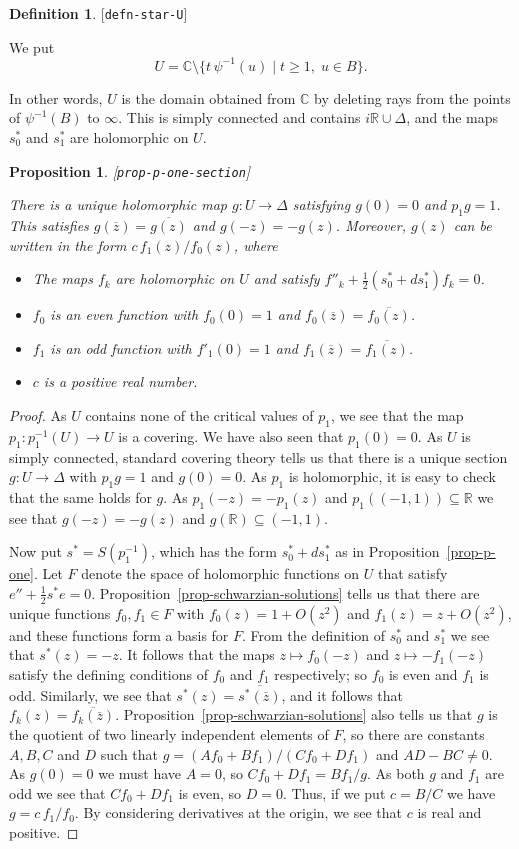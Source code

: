 \documentclass[reqno]{amsart}
\newcommand{\lbl}[1]{\label{#1}\textup{[\texttt{#1}]}\par}
\newcommand{\lbl}{\label}
\newcommand{\Dl}        {\Delta}
\newcommand{\R}         {{\mathbb{R}}}
\newcommand{\C}         {{\mathbb{C}}}
\newcommand{\ov}[1]     {\overline{#1}}
\newcommand{\st}        {\;|\;}
\newcommand{\sm}        {\setminus}
\newcommand{\sse}       {\subseteq}
\newcommand{\half}      {\tfrac{1}{2}}
\renewcommand{\:}{\colon}
\newtheorem{proposition}[theorem]{Proposition}
\theoremstyle{definition}
\newtheorem{definition}[theorem]{Definition}
\begin{document}
\begin{definition}\lbl{defn-star-U}
 We put
 \[ U = \C \sm\{t\,\psi^{-1}(u)\st t\geq 1,\;u\in B\}. \]
\end{definition}
In other words, $U$ is the domain obtained from $\C$ by deleting
rays from the points of $\psi^{-1}(B)$ to $\infty$.  This is
simply connected and contains $i\R\cup\Dl$, and the maps $s^*_0$ and
$s^*_1$ are holomorphic on $U$.

\begin{proposition}\lbl{prop-p-one-section}
 There is a unique holomorphic map $g\:U\to\Dl$ satisfying $g(0)=0$
 and $p_1g=1$.  This satisfies $g(\ov{z})=\ov{g(z)}$ and
 $g(-z)=-g(z)$.  Moreover, $g(z)$ can be written in the form
 $c\,f_1(z)/f_0(z)$, where
 \begin{itemize}
  \item The maps $f_k$ are holomorphic on $U$ and satisfy
   $f''_k+\half(s^*_0+ds^*_1)f_k=0$.
  \item $f_0$ is an even function with $f_0(0)=1$ and
   $f_0(\ov{z})=\ov{f_0(z)}$.
  \item $f_1$ is an odd function with $f'_1(0)=1$ and
   $f_1(\ov{z})=\ov{f_1(z)}$.
  \item $c$ is a positive real number.
 \end{itemize}
\end{proposition}
\begin{proof}
 As $U$ contains none of the critical values of $p_1$, we see that
 the map $p_1\:p_1^{-1}(U)\to U$ is a covering.  We have also seen
 that $p_1(0)=0$.  As $U$ is simply connected, standard covering
 theory tells us that there is a unique section $g\:U\to\Dl$ with
 $p_1g=1$ and $g(0)=0$.  As $p_1$ is holomorphic, it is easy to check
 that the same holds for $g$.  As $p_1(-z)=-p_1(z)$ and
 $p_1((-1,1))\sse\R$ we see that $g(-z)=-g(z)$ and
 $g(\R)\sse(-1,1)$.

 Now put $s^*=S(p_1^{-1})$, which has the form $s^*_0+ds_1^*$ as in
 Proposition~\ref{prop-p-one}.  Let $F$ denote the space of
 holomorphic functions on $U$ that satisfy $e''+\half s^*e=0$.
 Proposition~\ref{prop-schwarzian-solutions} tells us that there are
 unique functions $f_0,f_1\in F$ with $f_0(z)=1+O(z^2)$ and
 $f_1(z)=z+O(z^2)$, and these functions form a basis for $F$.  From
 the definition of $s^*_0$ and $s^*_1$ we see that $s^*(z)=-z$.  It
 follows that the maps $z\mapsto f_0(-z)$ and $z\mapsto -f_1(-z)$
 satisfy the defining conditions of $f_0$ and $f_1$ respectively; so
 $f_0$ is even and $f_1$ is odd.  Similarly, we see that
 $s^*(z)=\ov{s^*(\ov{z})}$, and it follows that
 $f_k(z)=\ov{f_k(\ov{z})}$.  Proposition~\ref{prop-schwarzian-solutions}
 also tells us that $g$ is the quotient of two linearly independent
 elements of $F$, so there are constants $A,B,C$ and $D$ such that
 $g=(Af_0+Bf_1)/(Cf_0+Df_1)$ and $AD-BC\neq 0$.  As $g(0)=0$ we must
 have $A=0$, so $Cf_0+Df_1=Bf_1/g$.  As both $g$ and $f_1$ are odd we
 see that $Cf_0+Df_1$ is even, so $D=0$.  Thus, if we put $c=B/C$ we
 have $g=c\,f_1/f_0$.  By considering derivatives at the origin, we
 see that $c$ is real and positive.
\end{proof}
\end{document}
